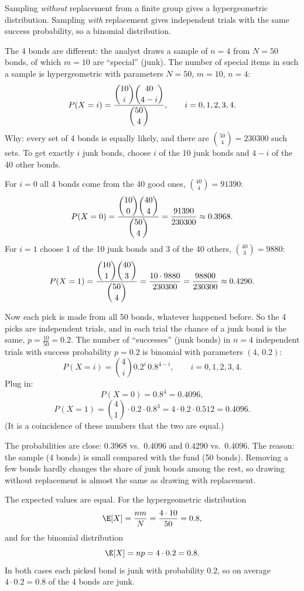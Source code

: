 \begin{solution}
	\idea Sampling \emph{without} replacement from a finite group gives a
	hypergeometric distribution. Sampling \emph{with} replacement gives
	independent trials with the same success probability, so a binomial
	distribution.

	 The 4 bonds are different: the analyst draws a sample of $n=4$
	from $N=50$ bonds, of which $m=10$ are ``special'' (junk). The number of
	special items in such a sample is hypergeometric with parameters
	$N=50$, $m=10$, $n=4$:
	\[ P(X=i)=\frac{\dbinom{10}{i}\dbinom{40}{4-i}}{\dbinom{50}{4}},
		\qquad i=0,1,2,3,4. \]
	Why: every set of 4 bonds is equally likely, and there are
	$\binom{50}{4}=230300$ such sets. To get exactly $i$ junk bonds, choose
	$i$ of the 10 junk bonds and $4-i$ of the 40 other bonds.

	For $i=0$ all 4 bonds come from the 40 good ones, $\binom{40}{4}=91390$:
	\[ P(X=0)=\frac{\dbinom{10}{0}\dbinom{40}{4}}{\dbinom{50}{4}}
		=\frac{91390}{230300}\approx0.3968. \]
	For $i=1$ choose 1 of the 10 junk bonds and 3 of the 40 others,
	$\binom{40}{3}=9880$:
	\[ P(X=1)=\frac{\dbinom{10}{1}\dbinom{40}{3}}{\dbinom{50}{4}}
		=\frac{10\cdot9880}{230300}=\frac{98800}{230300}\approx0.4290. \]

	 Now each pick is made from all 50 bonds, whatever happened
	before. So the 4 picks are independent trials, and in each trial the
	chance of a junk bond is the same, $p=\frac{10}{50}=0.2$. The number of
	``successes'' (junk bonds) in $n=4$ independent trials with success
	probability $p=0.2$ is binomial with parameters $(4,\,0.2)$:
	\[ P(X=i)=\binom{4}{i}0.2^i\,0.8^{4-i},\qquad i=0,1,2,3,4. \]
	Plug in:
	\[ P(X=0)=0.8^4=0.4096, \]
	\[ P(X=1)=\binom41\cdot0.2\cdot0.8^3=4\cdot0.2\cdot0.512=0.4096. \]
	(It is a coincidence of these numbers that the two are equal.)

	 The probabilities are close: $0.3968$ vs.\ $0.4096$ and
	$0.4290$ vs.\ $0.4096$. The reason: the sample (4 bonds) is small
	compared with the fund (50 bonds). Removing a few bonds hardly changes
	the share of junk bonds among the rest, so drawing without replacement
	is almost the same as drawing with replacement.

	The expected values are equal. For the hypergeometric distribution
	\[ \E[X]=\frac{nm}{N}=\frac{4\cdot10}{50}=0.8, \]
	and for the binomial distribution
	\[ \E[X]=np=4\cdot0.2=0.8. \]
	In both cases each picked bond is junk with probability $0.2$, so on
	average $4\cdot0.2=0.8$ of the 4 bonds are junk.


\end{solution}
